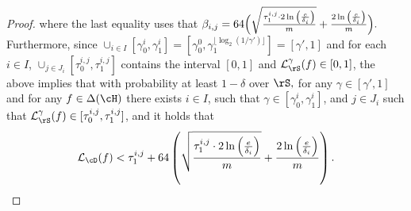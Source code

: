 \begin{proof}
    where the last equality uses that $ \beta_{i,j}=64\Big(\sqrt{\frac{\tau_{1}^{i,j}\cdot 2 \ln{\left(\frac{e}{\delta_{i}} \right)}}{m}} 
    +\frac{2\ln{\left(\frac{e}{\delta_{i}} \right)}}{m}\Big). $ 
    Furthermore, since $ \cup_{i\in I} [\gamma_{0}^{i},\gamma_{1}^{i}]=[\gamma_{0}^{0},\gamma_{1}^{\lfloor\log_{2}(  1/\gamma')\rfloor}]=[\gamma',1] $ and  for each $ i\in I $,  $ \cup_{j\in J_{i}} [\tau_{0}^{i,j},\tau_{1}^{i,j}]$ contains the interval $ [0,1] $ and $ \ls_{\rS}^{\gamma}(f)\in [0,1] $, the above implies that with probability at least  $ 1-\delta$ over $ \rS, $  for any $ \gamma\in [\gamma',1] $ and for any
    $f\in \dlh$   there exists $ i\in I$, such that
    $\gamma \in \left[\gamma_{0}^{i},\gamma_{1}^{i}\right]$, and $j\in J_{i}$ such that $\ls_{\rS}^{\gamma}(f)\in [\tau_{0}^{i,j},\tau_{1}^{i,j}] $, and
    it holds that
    \begin{align}\label{eq:finalbound8}
        \ls_{\cD}(f) < \tau_{1}^{i,j} 
        + \cc\left(\sqrt{\frac{\tau_{1}^{i,j}\cdot 2 \ln{\left(\frac{e}{\delta_{i}} \right)}}{m}} 
        +\frac{2\ln{\left(\frac{e}{\delta_{i}} \right)}}{m}\right).
    \end{align}

\end{proof}
